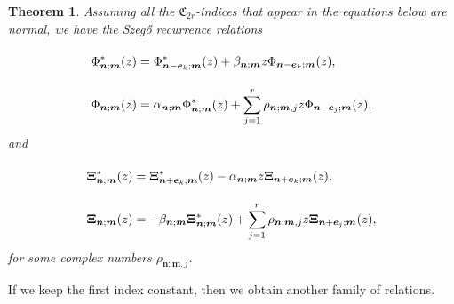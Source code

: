\documentclass[reqno,centertags,11pt,draft]{amsart}
\newtheorem{thm}{Theorem}[section]
\newcommand{\Z}{\mathbb{Z}}
\begin{document}
\begin{thm}\label{thm:Szego1}
    Assuming all the $\mathfrak{C}_{2r}$-indices that appear in the equations below are normal, we have the Szeg\H{o} recurrence relations 
    \begin{align}
         \label{eq:SzegoII1}
        \vphantom{\sum_{j = 1}^{r}} 
        & \Phi_{\bm{n};\bm{m}}^*(z) = \Phi_{\bm{n}-\bm{e}_k;\bm{m}}^*(z) + \beta_{\bm{n};\bm{m}}z\Phi_{\bm{n}-\bm{e}_k;\bm{m}}(z), 
        \\ \label{eq:SzegoII2}
        & \Phi_{\bm{n};\bm{m}}(z) = \alpha_{\bm{n};\bm{m}}\Phi_{\bm{n};\bm{m}}^*(z) + \sum_{j = 1}^r \rho_{\bm{n};\bm{m},j}z\Phi_{\bm{n}-\bm{e}_j;\bm{m}}(z), 
    \end{align}
    and
    \begin{align}
        \label{eq:SzegoI1}
        & \vphantom{\sum_{j = 1}^{r}} 
        \bm{\Xi}^*_{\bm{n};\bm{m}}(z) = \bm{\Xi}^*_{\bm{n}+\bm{e}_k;\bm{m}}(z) -\alpha_{\bm{n};\bm{m}}z\bm{\Xi}_{\bm{n}+\bm{e}_k;\bm{m}}(z),
        \\
        \label{eq:SzegoI2}
        & \bm{{\Xi}}_{\bm{n};\bm{m}}(z) = -\beta_{\bm{n};\bm{m}}\bm{\Xi}^*_{\bm{n};\bm{m}}(z) + \sum_{j = 1}^{r}\rho_{\bm{n};\bm{m},j}z\bm{\Xi}_{\bm{n}+\bm{e}_j;\bm{m}}(z),
\end{align}
for some complex numbers $\rho_{\bm{n};\bm{m},j}$.
\end{thm}


If we keep the first index constant, then we obtain another family of relations.
\end{document}
